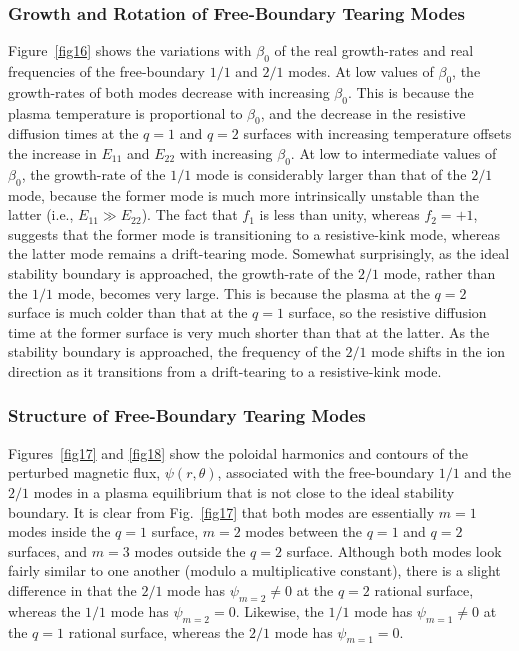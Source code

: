 \documentclass[12pt,prb,aps]{revtex4-1}
\begin{document}
\subsubsection{Growth and Rotation of Free-Boundary Tearing Modes}
Figure~\ref{fig16} shows the variations  with $\beta_0$ of the real growth-rates and real frequencies of the free-boundary $1/1$ and $2/1$ modes.  At low values of $\beta_0$, the growth-rates of both modes decrease with increasing
$\beta_0$. This is because  the plasma temperature is proportional to $\beta_0$, and the decrease in the resistive diffusion times at the $q=1$ and $q=2$ surfaces
with increasing temperature offsets the increase in $E_{11}$ and $E_{22}$ with increasing $\beta_0$. 
At low to intermediate values of $\beta_0$, the growth-rate
of the $1/1$ mode is considerably larger than that of the $2/1$ mode, because the former mode is much more intrinsically
unstable than the latter (i.e., $E_{11}\gg E_{22}$). The fact that $f_1$ is less than unity, whereas $f_2=+1$,  suggests that the former mode is transitioning to a resistive-kink mode,
whereas the latter mode remains a drift-tearing mode.\cite{ara} Somewhat surprisingly, as the ideal stability boundary is approached, the growth-rate of the
$2/1$ mode, rather than the $1/1$ mode, becomes very large.  This is because
the plasma at the $q=2$ surface is much colder than that at the $q=1$ surface, so the resistive diffusion time at the former surface is very much  shorter than
that at the latter. As the stability boundary is approached, the frequency of the  $2/1$ mode shifts  in the ion direction as it
transitions from a drift-tearing to a resistive-kink mode.\cite{ara}

\subsubsection{Structure of Free-Boundary Tearing Modes}
Figures~\ref{fig17} and \ref{fig18} show the poloidal harmonics and contours of the perturbed magnetic flux, $\psi(r,\theta)$, associated
with the free-boundary $1/1$ and the $2/1$ modes in a  plasma equilibrium that is not close to the ideal stability boundary. It is clear from Fig.~\ref{fig17} that both modes are essentially $m=1$ modes inside the $q=1$ surface, $m=2$ modes between
the $q=1$ and $q=2$  surfaces, and $m=3$ modes outside the $q=2$  surface. Although both modes look fairly similar to
one another (modulo a multiplicative constant), there is a slight difference in that the $2/1$ mode has $\psi_{m=2}\neq 0$ at the $q=2$ rational surface, whereas the $1/1$ mode has 
$\psi_{m=2}=0$.  Likewise, the $1/1$ mode has $\psi_{m=1}\neq 0$ at the $q=1$ rational surface, whereas the $2/1$ mode has 
$\psi_{m=1}=0$.
\end{document}
